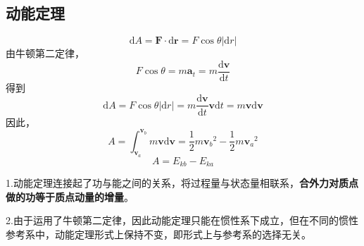 \subsection{动能定理}

$$\mathrm{d}A=\mathbf{F}\cdotp\mathrm{d}\mathbf{r}=F\cos\theta|\mathrm{d}r| $$
由牛顿第二定律，$$F\cos\theta=m\mathbf{a}_t=m\dfrac{\mathrm{d}\mathbf{v}}{\mathrm{d}t} $$
得到$$\mathrm{d}A=F\cos\theta|\mathrm{d}r|=m\dfrac{\mathrm{d}\mathbf{v}}{\mathrm{d}t}\mathbf{v}\mathrm{d}t=m\mathbf{v}\mathrm{d}\mathbf{v} $$
因此，$$A=\int_{\mathbf{v}_a}^{\mathbf{v}_b} m\mathbf{v}\mathrm{d}\mathbf{v}=\frac{1}{2}m{\mathbf{v}_b}^2-\frac{1}{2}m{\mathbf{v}_a}^2$$
$$A=E_{kb}-E_{ka}$$

1.动能定理连接起了功与能之间的关系，将过程量与状态量相联系，\textbf{合外力对质点做的功等于质点动量的增量}。

2.由于运用了牛顿第二定律，因此动能定理只能在惯性系下成立，但在不同的惯性参考系中，动能定理形式上保持不变，即形式上与参考系的选择无关。